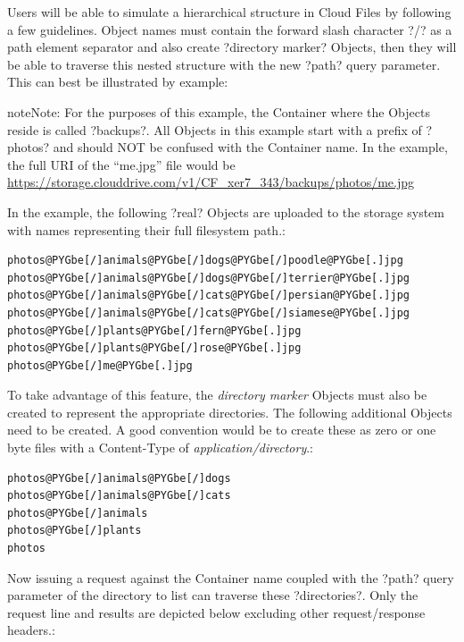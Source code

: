 \documentclass[letterpaper,10pt,english]{manual}
\begin{document}
Users will be able to simulate a hierarchical structure in Cloud Files
by following a few guidelines.  Object names must contain the forward
slash character ?/? as a path element separator and also create
?directory marker? Objects, then they will be able to traverse this nested
structure with the new ?path? query parameter.  This can best be
illustrated by example:

\begin{notice}{note}{Note:}
For the purposes of this example, the Container where the Objects
reside is called ?backups?.  All Objects in this example start with
a prefix of ?photos? and should NOT be confused with the Container
name.  In the example, the full URI of the ``me.jpg'' file would be
\href{https://storage.clouddrive.com/v1/CF\_xer7\_343/backups/photos/me.jpg}{https://storage.clouddrive.com/v1/CF\_xer7\_343/backups/photos/me.jpg}
\end{notice}

In the example, the following ?real? Objects are uploaded to the storage
system with names representing their full filesystem path.:

\begin{Verbatim}[commandchars=@\[\]]
photos@PYGbe[/]animals@PYGbe[/]dogs@PYGbe[/]poodle@PYGbe[.]jpg
photos@PYGbe[/]animals@PYGbe[/]dogs@PYGbe[/]terrier@PYGbe[.]jpg
photos@PYGbe[/]animals@PYGbe[/]cats@PYGbe[/]persian@PYGbe[.]jpg
photos@PYGbe[/]animals@PYGbe[/]cats@PYGbe[/]siamese@PYGbe[.]jpg
photos@PYGbe[/]plants@PYGbe[/]fern@PYGbe[.]jpg
photos@PYGbe[/]plants@PYGbe[/]rose@PYGbe[.]jpg
photos@PYGbe[/]me@PYGbe[.]jpg
\end{Verbatim}

To take advantage of this feature, the \emph{directory marker} Objects must
also be created to represent the appropriate directories.  The following
additional Objects need to be created.  A good convention would be to
create these as zero or one byte files with a Content-Type of
\emph{application/directory}.:

\begin{Verbatim}[commandchars=@\[\]]
photos@PYGbe[/]animals@PYGbe[/]dogs
photos@PYGbe[/]animals@PYGbe[/]cats
photos@PYGbe[/]animals
photos@PYGbe[/]plants
photos
\end{Verbatim}

Now issuing a  request against the Container name coupled with the
?path? query parameter of the directory to list can traverse these
?directories?.  Only the request line and results are depicted below
excluding other request/response headers.:
\end{document}

